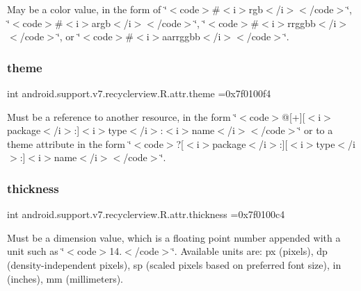 May be a color value, in the form of \char`\"{}$<$code$>$\#$<$i$>$rgb$<$/i$>$$<$/code$>$\char`\"{}, \char`\"{}$<$code$>$\#$<$i$>$argb$<$/i$>$$<$/code$>$\char`\"{}, \char`\"{}$<$code$>$\#$<$i$>$rrggbb$<$/i$>$$<$/code$>$\char`\"{}, or \char`\"{}$<$code$>$\#$<$i$>$aarrggbb$<$/i$>$$<$/code$>$\char`\"{}. \mbox{\label{classandroid_1_1support_1_1v7_1_1recyclerview_1_1R_1_1attr_a70073a6df58348e63a41fb0c34126186}} 
\subsubsection{\texorpdfstring{theme}{theme}}
{\footnotesize\ttfamily int android.\+support.\+v7.\+recyclerview.\+R.\+attr.\+theme =0x7f0100f4\hspace{0.3cm}{\ttfamily [static]}}

Must be a reference to another resource, in the form \char`\"{}$<$code$>$@\mbox{[}+\mbox{]}\mbox{[}$<$i$>$package$<$/i$>$\+:\mbox{]}$<$i$>$type$<$/i$>$\+:$<$i$>$name$<$/i$>$$<$/code$>$\char`\"{} or to a theme attribute in the form \char`\"{}$<$code$>$?\mbox{[}$<$i$>$package$<$/i$>$\+:\mbox{]}\mbox{[}$<$i$>$type$<$/i$>$\+:\mbox{]}$<$i$>$name$<$/i$>$$<$/code$>$\char`\"{}. \mbox{\label{classandroid_1_1support_1_1v7_1_1recyclerview_1_1R_1_1attr_a48cc98eb69804fa5cb50990c35a4f1bc}} 
\subsubsection{\texorpdfstring{thickness}{thickness}}
{\footnotesize\ttfamily int android.\+support.\+v7.\+recyclerview.\+R.\+attr.\+thickness =0x7f0100c4\hspace{0.3cm}{\ttfamily [static]}}

Must be a dimension value, which is a floating point number appended with a unit such as \char`\"{}$<$code$>$14.\+5sp$<$/code$>$\char`\"{}. Available units are\+: px (pixels), dp (density-\/independent pixels), sp (scaled pixels based on preferred font size), in (inches), mm (millimeters). 

